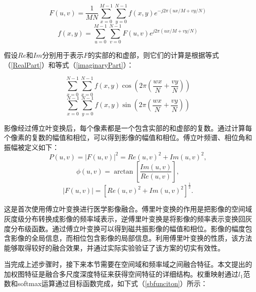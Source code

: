     \begin{equation}\label{ftFunction} %
     F(u,v)=\frac{1}{M N} \sum_{x=0}^{M-1} \sum_{y=0}^{N-1} f(x,y) e^{-j 2 \pi(u x / M+vy / N)}
    \end{equation}
    \begin{equation}\label{iftFunction} %
     f(x,y)=\sum_{u=0}^{M-1} \sum_{v=0}^{N-1} F(u,v) e^{j 2 \pi(u x / M+v y / N)}
    \end{equation}

假设$Re$和$Im$分别用于表示$F$的实部的和虚部，则它们的计算是根据等式（\ref{RealPart}）和等式（\ref{imaginaryPart}）：

    \begin{equation}\label{RealPart}   %
      \sum_{x=0}^{N-1} \sum_{x=0}^{N-1} f(x,y) \cos \left(2 \pi\left(\frac{w x}{N}+\frac{v y}{N}\right)\right)
    \end{equation}
    \begin{equation}\label{imaginaryPart}  %
       \sum_{x=0}^{N-1} \sum_{y=0}^{N-1} f(x,y) \sin \left(2 \pi\left(\frac{w x}{N}+\frac{v y}{N}\right)\right)
    \end{equation}

影像经过傅立叶变换后，每个像素都是一个包含实部的和虚部的复数。通过计算每个像素的复数的幅值和相位，可以得到影像的幅值和相位。傅立叶频谱、相位角和振幅被定义如下：
    \begin{equation}\label{amplitude}  %
       P(u,v)=|F(u,v)|^{2}=Re(u,v)^{2}+Im(u,v)^{2},
     \end{equation}
    \begin{equation}\label{PhaseAngle} %
     \phi(u,v)=\arctan \left[\frac{Im(u,v)}{Re(u,v)}\right],
    \end{equation}   
   \begin{equation}\label{spectrum}  %
      |F(u,v)|=\left[Re(u,v)^{2}+Im(u,v)^{2}\right]^{\frac{1}{2}}.
    \end{equation}

这是首次使用傅立叶变换进行医学影像融合。傅里叶变换的作用是把影像的空间域灰度级分布转换成影像的频率域表示，逆傅里叶变换是将影像的频率表示变换回灰度分布级函数。通过傅立叶变换可以得到磁共振影像的幅值和相位。影像的幅度包含影像的全局信息，而相位包含影像的局部信息。利用傅里叶变换的性质，该方法能够取得较好的融合效果，并通过实际实验验证了该方案的切实有效性。

当完成上述步骤时，接下来本节需要在空间域和频率域之间融合特征。本文提出的加权图特征是融合多尺度深度特征来获得空间特征的详细结构。权重映射通过$l_1$范数和softmax运算通过目标函数完成，如下式（\ref{sbfunciton}）所示：

